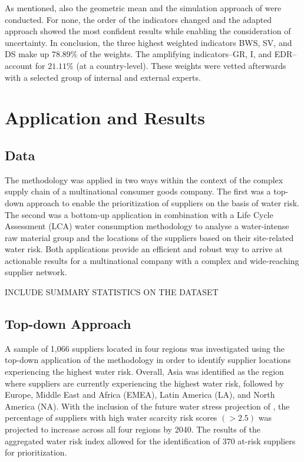 \documentclass[a4paper]{article}
\begin{document}
As mentioned, also the geometric mean and the simulation approach of \citep{Ataei:2013} were conducted.
For none, the order of the indicators changed and the adapted approach showed the most confident results while enabling the consideration of uncertainty.
In conclusion, the three highest weighted indicators BWS, SV, and DS make up $78.89\%$ of the weights. 
The amplifying indicators--GR, I, and EDR--account for $21.11\%$  (at a country-level). 
These weights were vetted afterwards with a selected group of internal and external experts.


\section{Application and Results}
\subsection{Data}
The methodology was applied in two ways within the context of the complex supply chain of a multinational consumer goods company. 
The first was a top-down approach to enable the prioritization of suppliers on the basis of water risk. 
The second was a bottom-up application in combination with a Life Cycle Assessment (LCA) water consumption methodology to analyse a water-intense raw material group and the locations of the suppliers based on their site-related water risk. 
Both applications provide an efficient and robust way to arrive at actionable results for a multinational company with a complex and wide-reaching supplier network.
 
 INCLUDE SUMMARY STATISTICS ON THE DATASET
 
\subsection{Top-down Approach}
A sample of 1,066 suppliers located in four regions was investigated using the top-down application of the methodology in order to identify supplier locations experiencing the highest water risk. 
Overall, Asia was identified as the region where suppliers are currently experiencing the highest water risk, followed by Europe, Middle East and Africa (EMEA), Latin America (LA), and North America (NA).
 With the inclusion of the future water stress projection of \citet{Luck:2015}, the percentage of suppliers with high water scarcity risk scores $(>2.5)$ was projected to increase across all four regions by 2040. 
 The results of the aggregated water risk index allowed for the identification of 370 at-risk suppliers for prioritization. 
 
\end{document}
